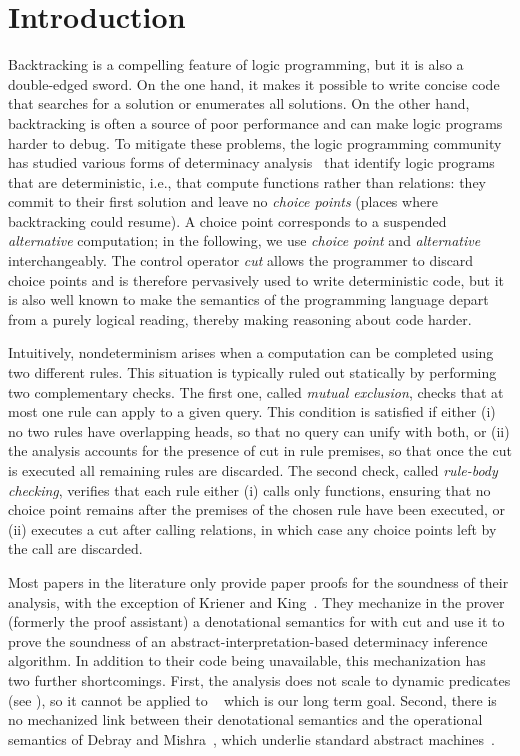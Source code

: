 \documentclass[sigplan,10pt,anonymous,review]{acmart}
\begin{document}
\section{Introduction}

Backtracking is a compelling feature of logic programming, but it is also a
double-edged sword. On the one hand, it makes it possible to write concise
code that searches for a solution or enumerates all solutions. On the other
hand, backtracking is often a source of poor performance and can make logic
programs harder to debug. To mitigate these problems, the logic programming
community has studied various forms of determinacy
analysis~\cite{1989Warren,1996Somogy,1996henderson,2011king,lopez2004determinacy,hanus2025,fissore2026}
that identify logic programs that are deterministic, i.e., that compute
functions rather than relations: they commit to their first solution and
leave no \emph{choice points} (places where backtracking could resume). A
choice point corresponds to a suspended \emph{alternative} computation; in
the following, we use \emph{choice point} and \emph{alternative}
interchangeably.
The control operator \emph{cut} allows the programmer to discard
choice points and is therefore pervasively used to write deterministic code,
but it is also well known to make the semantics of the programming language
depart from a purely logical reading, thereby making reasoning about code
 harder.

Intuitively, nondeterminism arises when a computation can be completed using
two different rules. This situation is typically ruled out statically by
performing two complementary checks. The first one, called
\emph{mutual exclusion}, checks that at most one rule can apply to a given
query. This condition is satisfied if either (i) no two rules have
overlapping heads, so that no query can unify with both, or (ii) the
analysis accounts for the presence of cut in rule premises, so that once the
cut is executed all remaining rules are discarded. The second check, called
\emph{rule-body checking}, verifies that each rule either (i) calls only
functions, ensuring that no choice point remains after the premises of the
chosen rule have been executed, or (ii) executes a cut after calling
relations, in which case any choice points left by the call are discarded.

Most papers in the literature only provide paper proofs for the soundness
of their analysis, with the exception of Kriener and King~\cite{2011king}.
They mechanize in the \rocqP{} prover (formerly the \coqP{} proof assistant) a
denotational semantics for \prologP with cut and use it to prove the
soundness of an abstract-interpretation-based determinacy inference
algorithm. In addition to their \rocqP{} code being unavailable, this
mechanization has two further shortcomings. First, the analysis does not
scale to dynamic predicates (see \cite[Sec.~8]{fissore2026}), so it cannot be
applied to
\lprologP~\cite{1991miller-pf,Miller_Nadathur_2012} which is our long term goal. Second, there is
no mechanized link between their denotational semantics and the operational
semantics of Debray and Mishra~\cite{Debray1988}, which underlie standard
\prologP abstract machines~\cite{warren1983abstract,1991ait-wam,10.1007/BFb0105415}.
\end{document}

